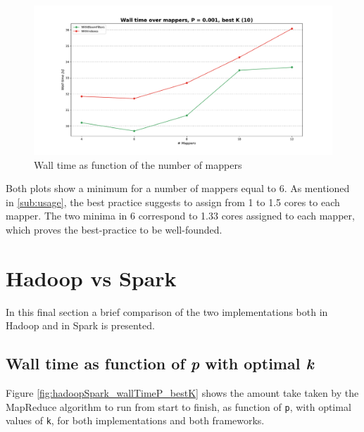 \begin{figure}[H]
    \begin{center}
        \includegraphics[scale=.45,trim={3cm 0 3cm 0},clip]{img/hadoop_wallTimeMap.pdf}
    \end{center}
    \vspace*{-0.5cm}
    \caption{Wall time as function of the number of mappers}
    \label{fig:hadoop_wallTimeMap}
\end{figure}

Both plots show a minimum for a number of mappers equal to 6. As mentioned in \ref{sub:usage}, the best practice suggests to assign from 1 to 1.5 cores to each mapper. The two minima in 6 correspond to 1.33 cores assigned to each mapper, which proves the best-practice to be well-founded.

\section{Hadoop vs Spark}

In this final section a brief comparison of the two implementations both in Hadoop and in Spark is presented.

\subsection*{Wall time as function of \textit{p} with optimal \textit{k}}

Figure \ref{fig:hadoopSpark_wallTimeP_bestK} shows the amount take taken by the MapReduce algorithm to run from start to finish, as function of \texttt{p}, with optimal values of \texttt{k}, for both implementations and both frameworks.\\

